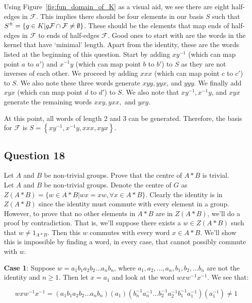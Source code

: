 \documentclass[12pt]{article}%
\newcommand{\rpm}{\raisebox{.2ex}{$\scriptstyle\pm$}}
\begin{document}
Using Figure~\ref{fig:fun_domain_of_K} as a visual aid, we see there are eight half-edges in
$\mathcal{F}$. This implies there should be four elements in our basis $S$ such that $S^{\rpm}=\left\{g\in
K | g\mathcal{F} \cap \mathcal{F} \neq \emptyset \right\}$. These should be the elements that map ends of
half-edges in $\mathcal{F}$ to ends of half-edges $\mathcal{F}$.  Good ones to start with are the words in
the kernel that have `minimal' length. Apart from the identity, these are the words listed at the
beginning of this question. Start by adding $xy^{-1}$ (which can map point $a$ to $a'$) and $x^{-1}y$
(which can map point $b$ to $b'$) to $S$ as they are not inverses of each other. We proceed by adding
$xxx$ (which can map point $c$ to $c'$) to $S$. We also note these three words generate $xyy, yyx$, and
$yyy$. We finally add $xyx$ (which can map point $d$ to $d'$) to $S$. We also note that $xy^{-1},
x^{-1}y$, and $xyx$ generate the remaining words $xxy, yxx,$ and $yxy$. 

At this point, all words of length 2 and 3 can be generated. Therefore, the basis for $\mathcal{F}$ is
$S=\left\{xy^{-1}, x^{-1}y, xxx, xyx\right\}$.

\subsection*{Question 18}

Let $A$ and $B$ be non-trivial groups. Prove that the centre of $A*B$ is trivial. \\

Let $A$ and $B$ be non-trivial groups. Denote the centre of $G$ as
$Z(A*B)=\{ w \in A*B | wx=xw, \forall x \in A*B \}$. Clearly the identity is in $Z(A*B)$ since the
identity must commute with every element in a group. However, to prove that no other elements in $A*B$ are
in $Z(A*B)$, we'll do a proof by contradiction. That is, we'll suppose there exists a $w\in Z(A*B)$ such
that $w \neq 1_{A*B}$. Then this $w$ commutes with every word $x \in A*B$. We'll show this is impossible
by finding a word, in every case, that cannot possibly commute with $w$.

\textbf{Case 1}: Suppose $w=a_{1}b_{1}a_{2}b_{2}\ldots a_{n}b_{n}$, where
$a_1,a_2,\ldots ,a_n, b_1,b_2,\ldots b_n$ are not the identity and $n\geq 1$. Then let $x=a_1$ and look
at the word $wxw^{-1}x^{-1}$. We see that:

\begin{dmath}
wxw^{-1}x^{-1}= (a_{1}b_{1}a_{2}b_{2}\ldots a_{n}b_{n}) (a_{1}) (b_{n}^{-1}a_{n}^{-1}\ldots b_{2}^{-1}a_{2}^{-1}b_{1}^{-1}a_{1}^{-1}) (a_{1}^{-1}) \neq 1
\end{dmath}
\end{document}
